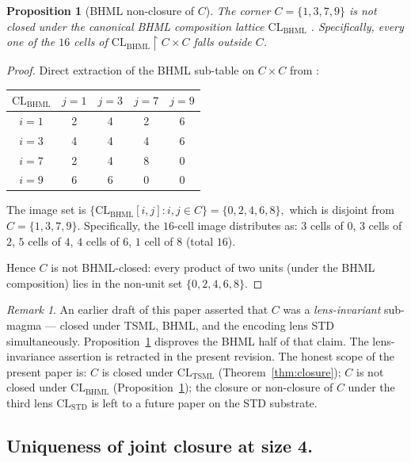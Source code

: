 \documentclass[11pt,reqno]{amsart}
\theoremstyle{plain}
\newtheorem{proposition}[theorem]{Proposition}
\theoremstyle{definition}
\theoremstyle{remark}
\newtheorem*{remark}{Remark}
\newcommand{\TSML}{\mathrm{TSML}}
\newcommand{\BHML}{\mathrm{BHML}}
\begin{document}
\begin{proposition}[BHML non-closure of $C$]\label{prop:bhml-fail}
The corner $C = \{1, 3, 7, 9\}$ is \emph{not} closed under the
canonical BHML composition lattice $\mathrm{CL}_\BHML$
\cite{SandersForcing}.  Specifically, every one of the $16$ cells of
$\mathrm{CL}_\BHML \restriction C \times C$ falls outside $C$.
\end{proposition}

\begin{proof}
Direct extraction of the BHML sub-table on $C \times C$ from
\cite[\S 6]{SandersForcing}:
\begin{center}
\begin{tabular}{c|cccc}
$\mathrm{CL}_\BHML$ & $j=1$ & $j=3$ & $j=7$ & $j=9$ \\
\hline
$i=1$ & 2 & 4 & 2 & 6 \\
$i=3$ & 4 & 4 & 4 & 6 \\
$i=7$ & 2 & 4 & 8 & 0 \\
$i=9$ & 6 & 6 & 0 & 0 \\
\end{tabular}
\end{center}
The image set is
\(
\{ \mathrm{CL}_\BHML[i, j] : i, j \in C \} = \{0, 2, 4, 6, 8\},
\)
which is disjoint from $C = \{1, 3, 7, 9\}$.  Specifically, the
$16$-cell image distributes as: $3$ cells of $0$, $3$ cells of $2$,
$5$ cells of $4$, $4$ cells of $6$, $1$ cell of $8$ (total $16$).

Hence $C$ is not BHML-closed: every product of two units (under the
BHML composition) lies in the non-unit set $\{0, 2, 4, 6, 8\}$.
\end{proof}

\begin{remark}\label{rem:lens-failure}
An earlier draft of this paper asserted that $C$ was a
\emph{lens-invariant} sub-magma --- closed under TSML, BHML, and the
encoding lens STD simultaneously.
Proposition~\ref{prop:bhml-fail} disproves the BHML half of that
claim.  The lens-invariance assertion is retracted in the present
revision.  The honest scope of the present paper is: $C$ is closed
under $\mathrm{CL}_\TSML$ (Theorem~\ref{thm:closure}); $C$ is not
closed under $\mathrm{CL}_\BHML$ (Proposition~\ref{prop:bhml-fail});
the closure or non-closure of $C$ under the third lens
$\mathrm{CL}_\mathrm{STD}$ is left to a future paper on the STD
substrate.
\end{remark}

\subsection{Uniqueness of joint closure at size 4.}
\end{document}
